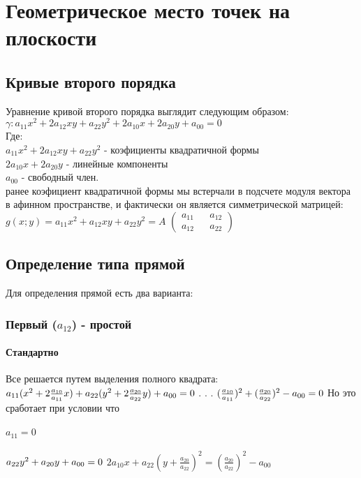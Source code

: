 \documentclass{book}
\begin{document}
\chapter{Геометрическое место точек на плоскости}
\section{Кривые второго порядка}
Уравнение кривой второго порядка выглядит следующим образом:\\
$\gamma:a_{11}x^2+2a_{12}xy+a_{22}y^2+2a_{10}x+2a_{20}y+a_{00}=0$\\
Где:\\
$a_{11}x^2+2a_{12}xy+a_{22}y^2$ - коэфициенты квадратичной формы\\
$2a_{10}x+2a_{20}y$ - линейные компоненты\\
$a_{00}$ - свободный член.\\
ранее коэфициент квадратичной формы мы встерчали в подсчете модуля вектора в афинном пространстве, и фактически он является симметрической матрицей:
$g(x;y)=a_{11}x^2+a_{12}xy+a_{22}y^2=A$
$
\begin{pmatrix}
    {a_{11}} && {a_{12}}\\
    {a_{12}} && {a_{22}}
\end{pmatrix}
$
\section{Определение типа прямой}
Для определения прямой есть два варианта:
\subsection{Первый ($a_{12}$) - простой}
\subsubsection{Стандартно}
Все решается путем выделения полного квадрата:
$a_{11}(x^2+2\frac{a_{10}}{a_{11}}x)+a_{22}(y^2+2\frac{a_{20}}{a_{22}}y)+a_{00}=0\\$
. . .
$(\frac{a_{10}}{a_{11}})^2+(\frac{a_{20}}{a_{22}})^2-a_{00}=0\\$
Но это сработает при условии что 
\subsubsection{$a_11=0$}
$a_{22}y^2+a_{20}y+a_{00}=0\\$
$2a_{10}x+a_{22}(y+\frac{a_{20}}{a_{22}})^2=(\frac{a_{20}}{a_{22}})^2-a_{00}$
\end{document}
